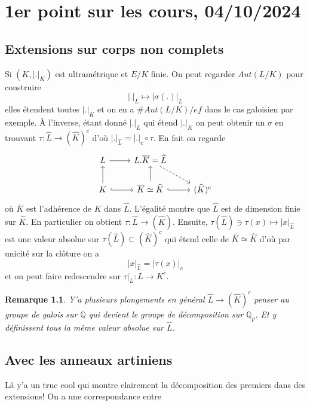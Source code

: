\documentclass[a4paper,12pt]{book}
\newcommand{\Q}{\mathbb{Q}}
\theoremstyle{plain}
\newtheorem{rem}{Remarque}
\theoremstyle{definition}
\theoremstyle{remark}
\begin{document}
\chapter{1er point sur les cours, 04/10/2024}
\section{Extensions sur corps non complets}
Si $(K, |.|_K)$ est ultramétrique et $E/K$ finie. On peut regarder
$Aut(L/K)$ pour construire
\[|.|_L\mapsto |\sigma(.)|_L\]
elles étendent toutes $|.|_K$ et on en a $\#Aut(L/K)/ef$ dans le cas
galoisien par exemple. À l'inverse, 
étant donné $|.|_L$ qui étend $|.|_K$ on peut obtenir un $\sigma$ en
trouvant $\tau\colon \widehat L\to (\widehat{K})^c$ d'où
$|.|_{\widehat L}= |.|_c\circ\tau$. En fait on regarde 
\[\begin{tikzcd}
	L & {L.\overline K=\widehat L} \\
	K & {\overline K\simeq \widehat K} & {(\widehat K)^c}
	\arrow[from=1-1, to=1-2]
	\arrow[dashed, from=1-2, to=2-3]
	\arrow[from=2-1, to=1-1]
	\arrow[hook, from=2-1, to=2-2]
	\arrow[from=2-2, to=1-2]
	\arrow[hook, from=2-2, to=2-3]
\end{tikzcd}\]
où $\overline K$ est l'adhérence de $K$ dans $\widehat L$. L'égalité
montre que $\widehat L$ est de dimension finie sur $\widehat K$. En
particulier on obtient $\tau \colon \widehat L\to (\widehat K)$. Ensuite,
$\tau(\widehat L)\ni\tau(x)\mapsto |x|_{\widehat L}$ est une valeur 
absolue sur $\tau(\widehat L)\subset (\widehat K)^c$ qui étend celle
de $\overline K\simeq \widehat K$ d'où par unicité sur la clôture on a
\[|x|_{\widehat L}=|\tau(x)|_c\]
et on peut faire redescendre sur $\tau|_L\colon L\to K^c$. 
\begin{rem}
    Y'a plusieurs plongements en général $\widehat L \to (\widehat K)^c$
    penser au groupe de galois sur $\Q$ qui devient le groupe de 
    décomposition sur $\Q_p$. Et y définissent tous la même valeur
    absolue sur $\widehat L$.
\end{rem}
\section{Avec les anneaux artiniens}
Là y'a un truc cool qui montre clairement la décomposition des premiers
dans des extensions! On a une correspondance entre 
\end{document}
